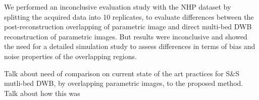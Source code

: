 We performed an inconclusive evaluation study with the NHP dataset by splitting the acquired data into 10 replicates, to evaluate differences between the post-reconstruction overlapping of parametric image and direct multi-bed DWB reconstruction of parametric images. But results were inconclusive and showed the need for a detailed simulation study to assess differences in terms of bias and noise properties of the overlapping regions. 

Talk about need of comparison on current state of the art practices for S\&S mutli-bed DWB, by overlapping parametric images, to the proposed method. Talk about how this was 
